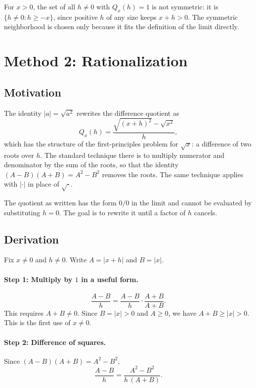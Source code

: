 \documentclass{essay}
\newcommand{\abs}[1]{\lvert #1 \rvert}
\begin{document}
\begin{remark}
  For $x > 0$, the set of all $h \neq 0$ with $Q_x(h) = 1$ is not symmetric:
  it is $\{h \neq 0 : h \geq -x\}$, since positive $h$ of any size keeps
  $x + h > 0$. The symmetric neighborhood is chosen only because it fits the
  definition of the limit directly.
\end{remark}

\section{Method 2: Rationalization}

\subsection{Motivation}

The identity $\abs{a} = \sqrt{a^2}$ rewrites the difference quotient as
\[
  Q_x(h) = \frac{\sqrt{(x+h)^2} - \sqrt{x^2}}{h},
\]
which has the structure of the first-principles problem for $\sqrt{x}$: a
difference of two roots over $h$. The standard technique there is to multiply
numerator and denominator by the sum of the roots, so that the identity
$(A - B)(A + B) = A^2 - B^2$ removes the roots. The same technique applies with
$\abs{\cdot}$ in place of $\sqrt{\cdot}$.

The quotient as written has the form $0/0$ in the limit and cannot be evaluated
by substituting $h = 0$. The goal is to rewrite it until a factor of $h$ cancels.

\subsection{Derivation}

Fix $x \neq 0$ and $h \neq 0$. Write $A = \abs{x+h}$ and $B = \abs{x}$.

\paragraph{Step 1: Multiply by $1$ in a useful form.}
\[
  \frac{A - B}{h} = \frac{A - B}{h} \cdot \frac{A + B}{A + B}.
\]
This requires $A + B \neq 0$. Since $B = \abs{x} > 0$ and $A \geq 0$, we have
$A + B \geq \abs{x} > 0$. This is the first use of $x \neq 0$.

\paragraph{Step 2: Difference of squares.}
Since $(A - B)(A + B) = A^2 - B^2$,
\[
  \frac{A - B}{h} = \frac{A^2 - B^2}{h\,(A + B)}.
\]
\end{document}
